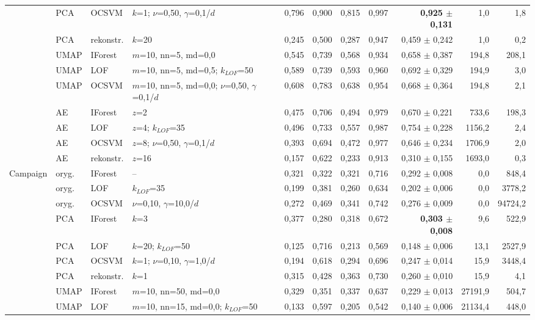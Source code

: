 \begin{longtable}{lllL{2.7cm}rrrrrrr}
 & PCA & OCSVM & $k$=1; $\nu$=0,50, $\gamma$=0,1/$d$ & 0,796 & 0,900 & 0,815 & 0,997 & \textbf{0,925 $\pm$ 0,131} & 1,0 & 1,8 \\
 & PCA & rekonstr. & $k$=20 & 0,245 & 0,500 & 0,287 & 0,947 & 0,459 $\pm$ 0,242 & 1,0 & 0,2 \\
 & UMAP & IForest & $m$=10, nn=5, md=0,0 & 0,545 & 0,739 & 0,568 & 0,934 & 0,658 $\pm$ 0,387 & 194,8 & 208,1 \\
 & UMAP & LOF & $m$=10, nn=5, md=0,5; $k_{LOF}$=50 & 0,589 & 0,739 & 0,593 & 0,960 & 0,692 $\pm$ 0,329 & 194,9 & 3,0 \\
 & UMAP & OCSVM & $m$=10, nn=5, md=0,0; $\nu$=0,50, $\gamma$=0,1/$d$ & 0,608 & 0,783 & 0,638 & 0,954 & 0,668 $\pm$ 0,364 & 194,8 & 2,1 \\
 & AE & IForest & $z$=2 & 0,475 & 0,706 & 0,494 & 0,979 & 0,670 $\pm$ 0,221 & 733,6 & 198,3 \\
 & AE & LOF & $z$=4; $k_{LOF}$=35 & 0,496 & 0,733 & 0,557 & 0,987 & 0,754 $\pm$ 0,228 & 1156,2 & 2,4 \\
 & AE & OCSVM & $z$=8; $\nu$=0,50, $\gamma$=0,1/$d$ & 0,393 & 0,694 & 0,472 & 0,977 & 0,646 $\pm$ 0,234 & 1706,9 & 2,0 \\
 & AE & rekonstr. & $z$=16 & 0,157 & 0,622 & 0,233 & 0,913 & 0,310 $\pm$ 0,155 & 1693,0 & 0,3 \\
\midrule
Campaign & oryg. & IForest & -- & 0,321 & 0,322 & 0,321 & 0,716 & 0,292 $\pm$ 0,008 & 0,0 & 848,4 \\
 & oryg. & LOF & $k_{LOF}$=35 & 0,199 & 0,381 & 0,260 & 0,634 & 0,202 $\pm$ 0,006 & 0,0 & 3778,2 \\
 & oryg. & OCSVM & $\nu$=0,10, $\gamma$=10,0/$d$ & 0,272 & 0,469 & 0,341 & 0,742 & 0,276 $\pm$ 0,009 & 0,0 & 94724,2 \\
 & PCA & IForest & $k$=3 & 0,377 & 0,280 & 0,318 & 0,672 & \textbf{0,303 $\pm$ 0,008} & 9,6 & 522,9 \\
 & PCA & LOF & $k$=20; $k_{LOF}$=50 & 0,125 & 0,716 & 0,213 & 0,569 & 0,148 $\pm$ 0,006 & 13,1 & 2527,9 \\
 & PCA & OCSVM & $k$=1; $\nu$=0,10, $\gamma$=1,0/$d$ & 0,194 & 0,618 & 0,294 & 0,696 & 0,247 $\pm$ 0,014 & 15,9 & 3448,4 \\
 & PCA & rekonstr. & $k$=1 & 0,315 & 0,428 & 0,363 & 0,730 & 0,260 $\pm$ 0,010 & 15,9 & 4,1 \\
 & UMAP & IForest & $m$=10, nn=50, md=0,0 & 0,329 & 0,351 & 0,337 & 0,637 & 0,229 $\pm$ 0,013 & 27191,9 & 504,7 \\
 & UMAP & LOF & $m$=10, nn=15, md=0,0; $k_{LOF}$=50 & 0,133 & 0,597 & 0,205 & 0,542 & 0,140 $\pm$ 0,006 & 21134,4 & 448,0 \\

\end{longtable}

